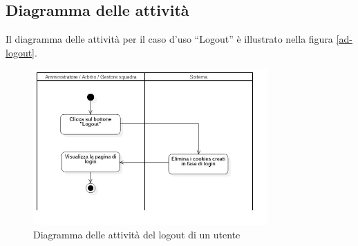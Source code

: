 \subsection*{Diagramma delle attività}
Il diagramma delle attività per il caso d'uso ``Logout'' è illustrato nella figura \vref{ad-logout}.

%
%
\begin{figure}
	\centering
	\includegraphics[width=0.8\textwidth]
	{immagini/ad-logout}
	
	\caption{Diagramma delle attività del logout di un utente}
	\label{ad-logout}
\end{figure}
